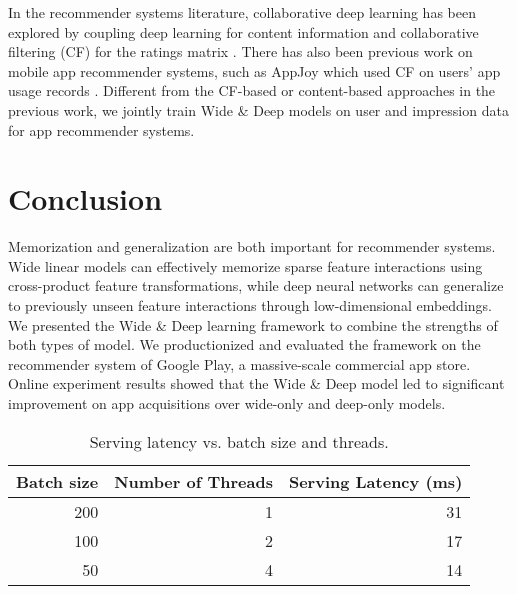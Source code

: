 \documentclass{sig-alternate-05-2015}
\begin{document}
In the recommender systems literature, collaborative deep learning has been explored by coupling deep learning for content information and collaborative filtering (CF) for the ratings matrix \cite{CollaborativeDLRecsKDD15}. There has also been previous work on mobile app recommender systems, such as AppJoy which used CF on users' app usage records \cite{AppJoyMobiSys11}. Different from the CF-based or content-based approaches in the previous work, we jointly train Wide \& Deep models on user and impression data for app recommender systems.

\section{Conclusion}
Memorization and generalization are both important for recommender systems. Wide linear models can effectively memorize sparse feature interactions using cross-product feature transformations, while deep neural networks can generalize to previously unseen feature interactions through low-dimensional embeddings. We presented the Wide \& Deep learning framework to combine the strengths of both types of model. We productionized and evaluated the framework on the recommender system of Google Play, a massive-scale commercial app store. Online experiment results showed that the Wide \& Deep model led to significant improvement on app acquisitions over wide-only and deep-only models.

\begin{table}
\caption{Serving latency vs. batch size and threads.}
\label{tab:ServingLatency}
\begin{tabular}{rrr}
\toprule
Batch size & Number of Threads & Serving Latency (ms)\\ \toprule
200 & 1 & 31 \\ \midrule
100 &  2 & 17 \\ \midrule
50 & 4 & 14 \\ \bottomrule
\end{tabular}
\vspace{-13pt}
\end{table}



\end{document}
